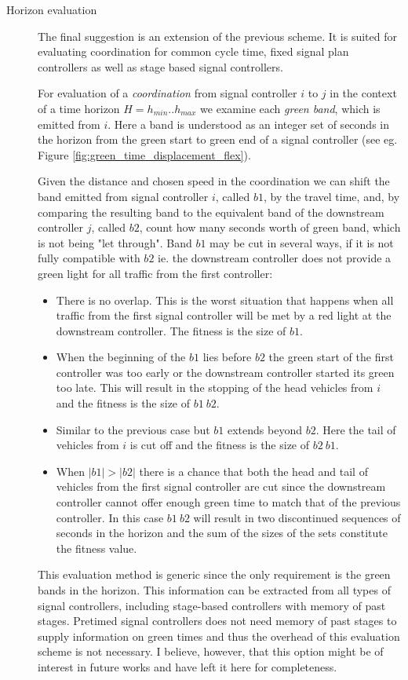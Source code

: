 \begin{description}
\item[Horizon evaluation]
The final suggestion is an extension of the previous scheme. It is suited for evaluating coordination for common cycle time, fixed signal plan controllers as well as stage based signal controllers.

For evaluation of a \textit{coordination} from signal controller $i$ to $j$ in the context of a time horizon $H = h_{min} .. h_{max}$ we examine each \textit{green band}, which is emitted from $i$. Here a band is understood as an integer set of seconds in the horizon from the green start to green end of a signal controller (see eg. Figure \ref{fig:green_time_displacement_flex}).

Given the distance and chosen speed in the coordination we can shift the band emitted from signal controller $i$, called $b1$, by the travel time, and, by comparing the resulting band to the equivalent band of the downstream controller $j$, called $b2$, count how many seconds worth of green band, which is not being "let through". Band $b1$ may be cut in several ways, if it is not fully compatible with $b2$ ie. the downstream controller does not provide a green light for all traffic from the first controller:

\begin{itemize}
\item There is no overlap. This is the worst situation that happens when all traffic from the first signal controller will be met by a red light at the downstream controller. The fitness is the size of $b1$.
\item When the beginning of the $b1$ lies before $b2$ the green start of the first controller was too early or the downstream controller started its green too late. This will result in the stopping of the head vehicles from $i$ and the fitness is the size of $b1 \ b2$.
\item Similar to the previous case but $b1$ extends beyond $b2$. Here the tail of vehicles from $i$ is cut off and the fitness is the size of $b2 \ b1$.
\item When $|b1|>|b2|$ there is a chance that both the head and tail of vehicles from the first signal controller are cut since the downstream controller cannot offer enough green time to match that of the previous controller. In this case $b1 \ b2$ will result in two discontinued sequences of seconds in the horizon and the sum of the sizes of the sets constitute the fitness value.
\end{itemize}

This evaluation method is generic since the only requirement is the green bands in the horizon. This information can be extracted from all types of signal controllers, including stage-based controllers with memory of past stages. Pretimed signal controllers does not need memory of past stages to supply information on green times and thus the overhead of this evaluation scheme is not necessary. I believe, however, that this option might be of interest in future works and have left it here for completeness.

\end{description}

